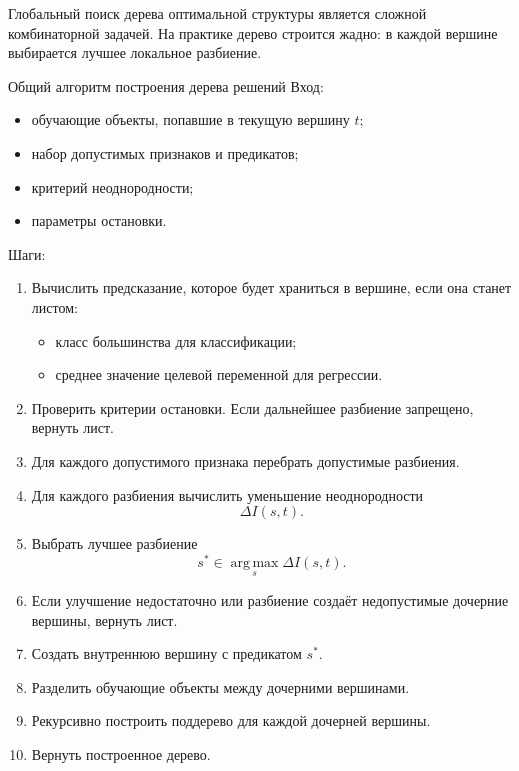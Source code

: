 \documentclass[12pt,a4paper]{article}
\theoremstyle{plain}
\theoremstyle{definition}
\theoremstyle{remark}
\newcommand{\argmax}{\operatorname*{arg\,max}}
\begin{document}
Глобальный поиск дерева оптимальной структуры является сложной
комбинаторной задачей. На практике дерево строится жадно: в каждой
вершине выбирается лучшее локальное разбиение.

\begin{algorithmblock}{Общий алгоритм построения дерева решений}
Вход:
\begin{itemize}
    \item обучающие объекты, попавшие в текущую вершину $t$;
    \item набор допустимых признаков и предикатов;
    \item критерий неоднородности;
    \item параметры остановки.
\end{itemize}

Шаги:
\begin{enumerate}[label=\arabic*.]
    \item Вычислить предсказание, которое будет храниться в вершине, если
    она станет листом:
    \begin{itemize}
        \item класс большинства для классификации;
        \item среднее значение целевой переменной для регрессии.
    \end{itemize}

    \item Проверить критерии остановки. Если дальнейшее разбиение
    запрещено, вернуть лист.

    \item Для каждого допустимого признака перебрать допустимые
    разбиения.

    \item Для каждого разбиения вычислить уменьшение неоднородности
    \[
        \Delta I(s,t).
    \]

    \item Выбрать лучшее разбиение
    \[
        s^*
        \in
        \argmax_s\Delta I(s,t).
    \]

    \item Если улучшение недостаточно или разбиение создаёт недопустимые
    дочерние вершины, вернуть лист.

    \item Создать внутреннюю вершину с предикатом $s^*$.

    \item Разделить обучающие объекты между дочерними вершинами.

    \item Рекурсивно построить поддерево для каждой дочерней вершины.

    \item Вернуть построенное дерево.
\end{enumerate}
\end{algorithmblock}
\end{document}
